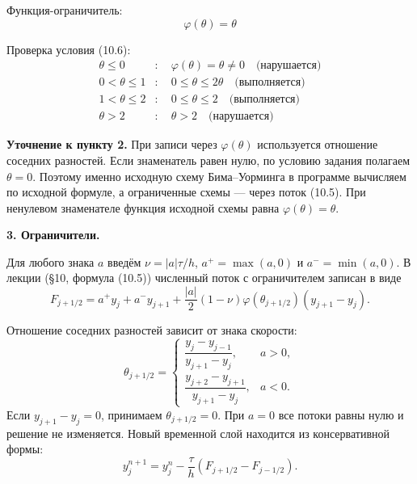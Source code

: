 \documentclass[12pt]{article}
\begin{document}
\noindent Функция-ограничитель:
\begin{equation*}
\varphi(\theta) = \theta
\end{equation*}

\noindent Проверка условия (10.6):
\begin{align*}
\theta \le 0 &: \quad \varphi(\theta) = \theta \neq 0 \quad \text{(нарушается)} \\
0 < \theta \le 1 &: \quad 0 \le \theta \le 2\theta \quad \text{(выполняется)} \\
1 < \theta \le 2 &: \quad 0 \le \theta \le 2 \quad \text{(выполняется)} \\
\theta > 2 &: \quad \theta > 2 \quad \text{(нарушается)}
\end{align*}



\bigskip
\noindent\textbf{Уточнение к пункту 2.}
При записи через $\varphi(\theta)$ используется отношение соседних
разностей. Если знаменатель равен нулю, по условию задания полагаем
$\theta=0$. Поэтому именно исходную схему Бима--Уорминга в программе
вычисляем по исходной формуле, а ограниченные схемы --- через поток (10.5).
При ненулевом знаменателе функция исходной схемы равна $\varphi(\theta)=\theta$.

\bigskip
\noindent\textbf{3. Ограничители.}

\noindent Для любого знака $a$ введём $\nu=|a|\tau/h$,
$a^+=\max(a,0)$ и $a^-=\min(a,0)$. В лекции (§10, формула (10.5))
численный поток с ограничителем записан в виде
\begin{equation}
 F_{j+1/2}=a^+y_j+a^-y_{j+1}+
 \frac{|a|}{2}(1-\nu)\varphi(\theta_{j+1/2})(y_{j+1}-y_j).
\end{equation}

\noindent Отношение соседних разностей зависит от знака скорости:
\begin{equation}
 \theta_{j+1/2}=\begin{cases}
 \dfrac{y_j-y_{j-1}}{y_{j+1}-y_j},&a>0,\\[7pt]
 \dfrac{y_{j+2}-y_{j+1}}{y_{j+1}-y_j},&a<0.
 \end{cases}
\end{equation}
Если $y_{j+1}-y_j=0$, принимаем $\theta_{j+1/2}=0$.
При $a=0$ все потоки равны нулю и решение не изменяется.
Новый временной слой находится из консервативной формы:
\begin{equation}
 y_j^{n+1}=y_j^n-\frac{\tau}{h}(F_{j+1/2}-F_{j-1/2}).
\end{equation}
\end{document}
